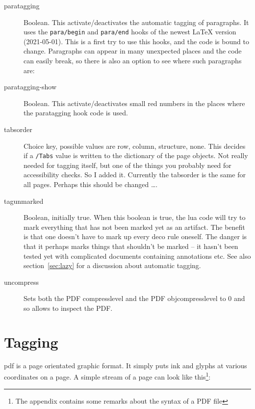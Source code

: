 \documentclass[DIV=12,parskip=half-,bibliography=totoc]{scrartcl}
\newcommand\PrintKeyName[1]{\textsf{#1}}
\newcommand\PDF{PDF}
\begin{document}
\begin{description}
\item[\PrintKeyName{paratagging}] Boolean. This activate/deactivates the automatic tagging of paragraphs.
 It uses the \texttt{para/begin} and \texttt{para/end} hooks of the newest \LaTeX{} version (2021-05-01).
 This is a first try to use this hooks, and the code is bound to change. Paragraphs can appear in many unexpected
 places and the code can easily break, so there is also an option to see where such paragraphs are:

\item[\PrintKeyName{paratagging-show}] Boolean. This activate/deactivates small red numbers in the places where the paratagging hook code is used.


\item[\PrintKeyName{tabsorder}]
 Choice key, possible values are \PrintKeyName{row}, \PrintKeyName{column}, \PrintKeyName{structure}, \PrintKeyName{none}.  This decides if a \verb+/Tabs+ value is written to the dictionary of the page objects. Not really needed for tagging itself, but one of the things you probably need for accessibility checks. So I added it. Currently the tabsorder is the same for all pages. Perhaps this should be changed \ldots.
\item[\PrintKeyName{tagunmarked}]
 Boolean, initially true. When this boolean is true, the lua code will try to mark everything that has not been marked yet as an artifact. The benefit is that one doesn't have to mark up every deco rule oneself. The danger is that it perhaps marks things that shouldn't be marked -- it hasn't been tested yet with complicated documents containing annotations etc. See also section~\ref{sec:lazy} for a discussion about automatic tagging.
\item[\PrintKeyName{uncompress}]
 Sets both the \PDF{} compresslevel and the \PDF{} objcompresslevel to 0 and so allows to inspect the \PDF{}.


\end{description}



\section{Tagging}


pdf is a page orientated graphic format. It simply puts ink and glyphs at various coordinates on a page. A simple stream of a page can look like this\tagpdfparaOff\footnote{The appendix contains some remarks about the syntax of a \PDF{} file}\tagpdfparaOn:
\end{document}
